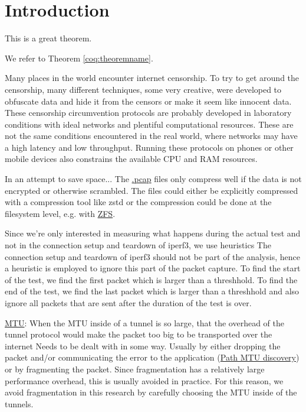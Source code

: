 
\chapter{Introduction}


\begin{theorem}[Test][theoremname]
  This is a great theorem.
\end{theorem}

We refer to Theorem \ref{coq:theoremname}.


Many places in the world encounter internet censorship. To try to get around the censorship, many different techniques, some very creative, were developed to obfuscate data and hide it from the censors or make it seem like innocent data. These censorship circumvention protocols are probably developed in laboratory conditions with ideal networks and plentiful computational resources. These are not the same conditions encountered in the real world, where networks may have a high latency and low throughput. Running these protocols on phones or other mobile devices also constrains the available CPU and RAM resources.



In an attempt to save space...
The \href{https://en.wikipedia.org/wiki/Pcap}{.pcap} files only compress well if the data is not encrypted or otherwise scrambled.
The files could either be explicitly compressed with a compression tool like zstd or the compression could be done at the filesystem level, e.g. with \href{https://openzfs.org/wiki/Main_Page}{ZFS}.


Since we're only interested in measuring what happens during the actual test and not in the connection setup and teardown of iperf3, we use heuristics
The connection setup and teardown of iperf3 should not be part of the analysis, hence a heuristic is employed to ignore this part of the packet capture. To find the start of the test, we find the first packet which is larger than a threshhold. To find the end of the test, we find the last packet which is larger than a threshhold and also ignore all packets that are sent after the duration of the test is over.

\href{https://en.wikipedia.org/wiki/Maximum_transmission_unit}{MTU}:
When the MTU inside of a tunnel is so large, that the overhead of the tunnel protocol would make the packet too big to be transported over the internet
Needs to be dealt with in some way. Usually by either dropping the packet and/or communicating the error to the application (\href{https://en.wikipedia.org/wiki/Path_MTU_Discovery}{Path MTU discovery}) or by fragmenting the packet. Since fragmentation has a relatively large performance overhead, this is usually avoided in practice. For this reason, we avoid fragmentation in this research by carefully choosing the MTU inside of the tunnels.

